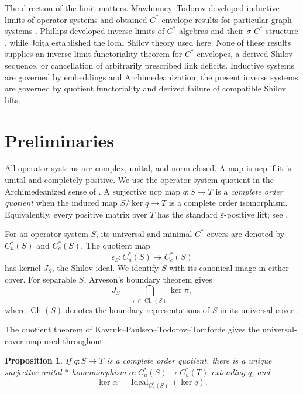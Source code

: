 \documentclass[11pt,a4paper]{amsart}
\theoremstyle{plain}
\newtheorem{proposition}[theorem]{Proposition}
\theoremstyle{definition}
\newcommand{\Cu}{C_u^*}
\newcommand{\Ce}{C_e^*}
\newcommand{\Ideal}{\operatorname{Ideal}}
\newcommand{\Ch}{\operatorname{Ch}}
\begin{document}
The direction of the limit matters.  Mawhinney--Todorov developed inductive limits of operator
systems and obtained $C^*$-envelope results for particular graph systems
\cite{MawhinneyTodorov2018}.  Phillips developed inverse limits of $C^*$-algebras and their
$\sigma$-$C^*$ structure \cite{Phillips1988}, while Joi\c{t}a established the local Shilov theory
used here.  None of these results supplies an inverse-limit functoriality theorem for
$C^*$-envelopes, a derived Shilov sequence, or cancellation of arbitrarily prescribed link
deficits.  Inductive systems are governed by embeddings and Archimedeanization; the present
inverse systems are governed by quotient functoriality and derived failure of compatible Shilov
lifts.

\section{Preliminaries}\label{sec:preliminaries}

All operator systems are complex, unital, and norm closed.  A map is ucp if it is unital and
completely positive.  We use the operator-system quotient in the Archimedeanized sense of
\cite{KPTT2013}.  A surjective ucp map $q:S\to T$ is a \emph{complete order quotient} when the
induced map $S/\ker q\to T$ is a complete order isomorphism.  Equivalently, every positive matrix
over $T$ has the standard $\varepsilon$-positive lift; see \cite{Han2011}.

For an operator system $S$, its universal and minimal $C^*$-covers are denoted by $\Cu(S)$ and
$\Ce(S)$.  The quotient map
\[
 \epsilon_S:\Cu(S)\twoheadrightarrow\Ce(S)
\]
has kernel $J_S$, the Shilov ideal.  We identify $S$ with its canonical image in either cover.
For separable $S$, Arveson's boundary theorem gives
\begin{equation}\label{eq:boundary-kernel}
 J_S=\bigcap_{\pi\in\Ch(S)}\ker\pi,
\end{equation}
where $\Ch(S)$ denotes the boundary representations of $S$ in its universal cover
\cite{Arveson1969,Arveson2008}.

The quotient theorem of Kavruk--Paulsen--Todorov--Tomforde gives the universal-cover map used
throughout.

\begin{proposition}\label{prop:universal-quotient}
If $q:S\to T$ is a complete order quotient, there is a unique surjective unital
$*$-homomorphism $\alpha:\Cu(S)\to\Cu(T)$ extending $q$, and
\begin{equation}\label{eq:kernel-universal}
 \ker\alpha=\Ideal_{\Cu(S)}(\ker q).
\end{equation}
\end{proposition}
\end{document}
